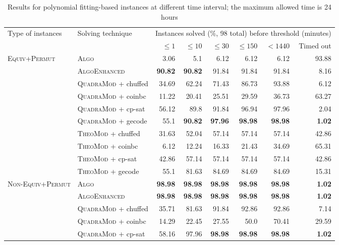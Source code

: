 \documentclass{book}
\begin{document}
\vspace{2cm}

\begin{table}[]\scriptsize\centering
\caption{Results for polynomial fitting-based instances at different time interval; the maximum allowed time is 24 hours}
\begin{tabular}{@{}ll rr rr rr@{}}\toprule Type of instances & Solving technique  & \multicolumn{6}{c}{Instances solved (\%, 98 total) before threshold (minutes)}\\\cmidrule(l){3-8}&  &  $\leq 1$ &  $\leq 10$ &  $\leq 30$ &  $\leq 150$ &  $ < 1440$ & Timed out\\
\midrule
\multirow{10}{*}{\textsc{Equiv+Permut}} & \textsc{Algo}   & 3.06 & 5.1 & 6.12 & 6.12 & 6.12 & 93.88 \\
& \textsc{AlgoEnhanced}   & \bf 90.82 & \bf 90.82 & 91.84 & 91.84 & 91.84 & 8.16 \\
& \textsc{QuadraMod} + chuffed   & 34.69 & 62.24 & 71.43 & 86.73 & 93.88 & 6.12 \\
& \textsc{QuadraMod} + coinbc   & 11.22 & 20.41 & 25.51 & 29.59 & 36.73 & 63.27 \\
& \textsc{QuadraMod} + cp-sat   & 56.12 & 89.8 & 91.84 & 96.94 & 97.96 & 2.04 \\
& \textsc{QuadraMod} + gecode   & 55.1 & \bf 90.82 & \bf 97.96 & \bf 98.98 & \bf 98.98 &  \bf 1.02 \\
& \textsc{TheoMod} + chuffed   & 31.63 & 52.04 & 57.14 & 57.14 & 57.14 & 42.86 \\
& \textsc{TheoMod} + coinbc   & 6.12 & 12.24 & 16.33 & 21.43 & 34.69 & 65.31 \\
& \textsc{TheoMod} + cp-sat   & 42.86 & 57.14 & 57.14 & 57.14 & 57.14 & 42.86 \\
& \textsc{TheoMod} + gecode   & 55.1 & 81.63 & 84.69 & 84.69 & 84.69 & 15.31 \\
\midrule\multirow{10}{*}{\textsc{Non-Equiv+Permut}} & \textsc{Algo}   & \bf 98.98 & \bf 98.98 & \bf 98.98 & \bf 98.98 & \bf 98.98 &  \bf 1.02 \\
& \textsc{AlgoEnhanced}   & \bf 98.98 & \bf 98.98 & \bf 98.98 & \bf 98.98 & \bf 98.98 &  \bf 1.02 \\
& \textsc{QuadraMod} + chuffed   & 35.71 & 81.63 & 91.84 & 92.86 & 92.86 & 7.14 \\
& \textsc{QuadraMod} + coinbc   & 14.29 & 22.45 & 27.55 & 50.0 & 70.41 & 29.59 \\
& \textsc{QuadraMod} + cp-sat   & 58.16 & 97.96 & \bf 98.98 & \bf 98.98 & \bf 98.98 &  \bf 1.02 \\

\end{tabular}
\end{table}
\end{document}
